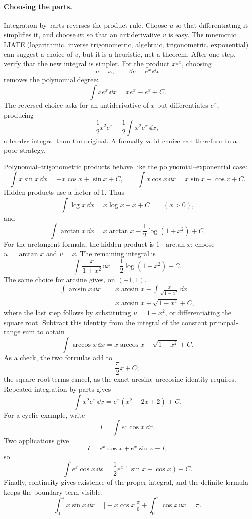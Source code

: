\paragraph{Choosing the parts.}
Integration by parts reverses the product rule. Choose \(u\) so that
differentiating it simplifies it, and choose \(\dd v\) so that an
antiderivative \(v\) is easy. The mnemonic LIATE (logarithmic, inverse
trigonometric, algebraic, trigonometric, exponential) can suggest a choice
of \(u\), but it is a heuristic, not a theorem. After one step, verify that
the new integral is simpler.
For the product $xe^x$, choosing
\[
u=x,\qquad \dd v=e^x\,\dd x
\]
removes the polynomial degree:
\[
\int xe^x\,\dd x=xe^x-e^x+C.
\]
The reversed choice asks for an antiderivative of \(x\) but differentiates
\(e^x\), producing
\[
\frac12x^2e^x-\frac12\int x^2e^x\,\dd x,
\]
 a harder
integral than the original. A formally valid choice can therefore be a poor
strategy.

\begin{example}
Polynomial--trigonometric products behave like the polynomial--exponential
case:
\[
\int x\sin x\,\dd x=-x\cos x+\sin x+C,
\qquad
\int x\cos x\,\dd x=x\sin x+\cos x+C.
\]
Hidden products use a factor of \(1\). Thus
\[
\int\log x\,\dd x=x\log x-x+C
\qquad(x>0),
\]
and
\[
\int\arctan x\,\dd x
=x\arctan x-\frac12\log(1+x^2)+C.
\]
For the arctangent formula, the hidden product is $1\cdot\arctan x$;
choose $u=\arctan x$ and $v=x$. The remaining integral is
\[
\int\frac{x}{1+x^2}\,\dd x=\frac12\log(1+x^2)+C.
\]
The same choice for arcsine gives, on $(-1,1)$,
\[
\begin{aligned}
\int\arcsin x\,\dd x
 &=x\arcsin x-\int\frac{x}{\sqrt{1-x^2}}\,\dd x\\
 &=x\arcsin x+\sqrt{1-x^2}+C,
\end{aligned}
\]
where the last step follows by substituting $u=1-x^2$, or differentiating
the square root. Subtract this identity from the integral of the constant
principal-range sum to obtain
\[
\int\arccos x\,\dd x=x\arccos x-\sqrt{1-x^2}+C.
\]
As a check, the two formulas add to
\[
\frac\pi2x+C;
\]
the square-root terms cancel, as the exact arcsine--arccosine identity requires.
Repeated integration by parts gives
\[
\int x^2e^x\,\dd x=e^x(x^2-2x+2)+C.
\]
For a cyclic example, write
\[
I=\int e^x\cos x\,\dd x.
\]
 Two applications
give
\[
I=e^x\cos x+e^x\sin x-I,
\]
so
\[
\int e^x\cos x\,\dd x
=\frac12e^x(\sin x+\cos x)+C.
\]
Finally, continuity gives existence of the proper integral, and the definite
formula keeps the boundary term visible:
\[
\int_0^\pi x\sin x\,\dd x
=\bigl[-x\cos x\bigr]_0^\pi+\int_0^\pi\cos x\,\dd x
=\pi.
\]
\end{example}

